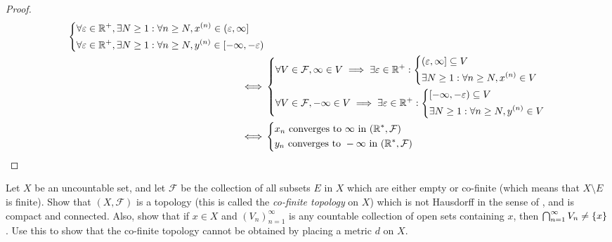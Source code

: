 \begin{proof}
\begin{align*}
\begin{dcases}
             \forall \varepsilon \in \mathbb{R}^+, \exists N \geq 1 : \forall n \geq N, x^{(n)} \in (\varepsilon, \infty] \\
             \forall \varepsilon \in \mathbb{R}^+, \exists N \geq 1 : \forall n \geq N, y^{(n)} \in [-\infty, -\varepsilon)
           \end{dcases} \\
    \iff & \begin{dcases}
             \forall V \in \mathcal{F}, \infty \in V \implies \exists \varepsilon \in \mathbb{R}^+ : \begin{dcases}
                                                                                        (\varepsilon, \infty] \subseteq V \\
                                                                                        \exists N \geq 1 : \forall n \geq N, x^{(n)} \in V
                                                                                      \end{dcases} \\
             \forall V \in \mathcal{F}, -\infty \in V \implies \exists \varepsilon \in \mathbb{R}^+ : \begin{dcases}
                                                                                         [-\infty, -\varepsilon) \subseteq V \\
                                                                                         \exists N \geq 1 : \forall n \geq N, y^{(n)} \in V
                                                                                       \end{dcases}
           \end{dcases}                   \\
    \iff & \begin{dcases}
             x_n \text{ converges to } \infty \text{ in } (\mathbb{R}^*, \mathcal{F})  \\
             y_n \text{ converges to } -\infty \text{ in } (\mathbb{R}^*, \mathcal{F}) \\
           \end{dcases}
  \end{align*}
\end{proof}

\begin{ex}\label{ii:ex:2.5.6}
  Let \(X\) be an uncountable set, and let \(\mathcal{F}\) be the collection of all subsets \(E\) in \(X\) which are either empty or co-finite (which means that \(X \setminus E\) is finite).
  Show that \((X, \mathcal{F})\) is a topology (this is called the \emph{co-finite topology} on \(X\)) which is not Hausdorff in the sense of , and is compact and connected.
  Also, show that if \(x \in X\) and \((V_n)_{n = 1}^\infty\) is any countable collection of open sets containing \(x\), then \(\bigcap_{n = 1}^\infty V_n \neq \left\lbrace x\right\rbrace\).
  Use this to show that the co-finite topology cannot be obtained by placing a metric \(d\) on \(X\).
\end{ex}

